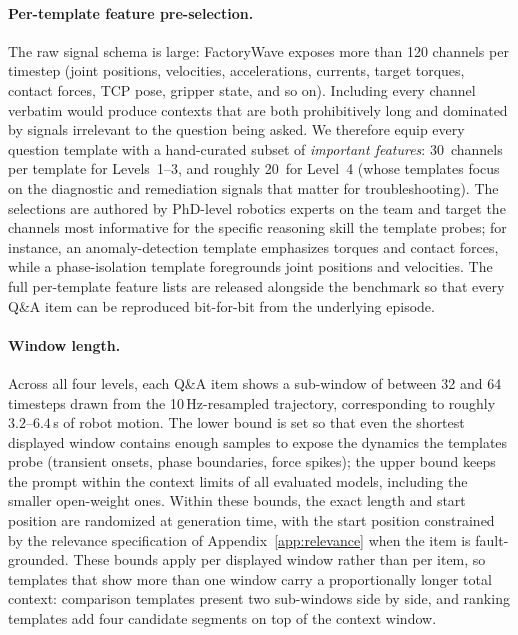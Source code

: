\paragraph{Per-template feature pre-selection.} The raw signal schema is large: FactoryWave exposes more than 120 channels per timestep (joint positions, velocities, accelerations, currents, target torques, contact forces, TCP pose, gripper state, and so on). Including every channel verbatim would produce contexts that are both prohibitively long and dominated by signals irrelevant to the question being asked. We therefore equip every question template with a hand-curated subset of \emph{important features}: 30~channels per template for Levels~1--3, and roughly 20~for Level~4 (whose templates focus on the diagnostic and remediation signals that matter for troubleshooting). The selections are authored by PhD-level robotics experts on the team and target the channels most informative for the specific reasoning skill the template probes; for instance, an anomaly-detection template emphasizes torques and contact forces, while a phase-isolation template foregrounds joint positions and velocities. The full per-template feature lists are released alongside the benchmark so that every Q\&A item can be reproduced bit-for-bit from the underlying episode.

\paragraph{Window length.} Across all four levels, each Q\&A item shows a sub-window of between 32 and 64 timesteps drawn from the 10\,Hz-resampled trajectory, corresponding to roughly $3.2$--$6.4$\,s of robot motion. The lower bound is set so that even the shortest displayed window contains enough samples to expose the dynamics the templates probe (transient onsets, phase boundaries, force spikes); the upper bound keeps the prompt within the context limits of all evaluated models, including the smaller open-weight ones. Within these bounds, the exact length and start position are randomized at generation time, with the start position constrained by the relevance specification of Appendix~\ref{app:relevance} when the item is fault-grounded. These bounds apply per displayed window rather than per item, so templates that show more than one window carry a proportionally longer total context: comparison templates present two sub-windows side by side, and ranking templates add four candidate segments on top of the context window.

